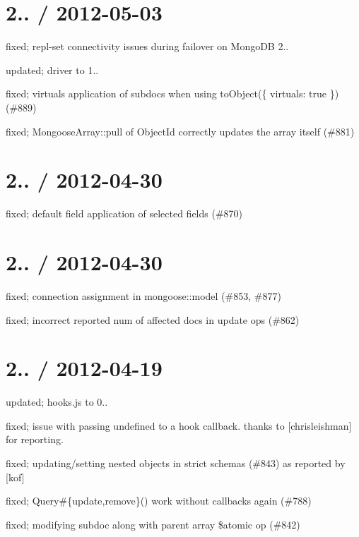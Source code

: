 \section*{2.. / 2012-\/05-\/03 }


\begin{DoxyItemize}
\item fixed; repl-\/set connectivity issues during failover on Mongo\+DB 2..
\item updated; driver to 1..
\item fixed; virtuals application of subdocs when using to\+Object(\{ virtuals\+: true \}) (\#889)
\item fixed; Mongoose\+Array\+::pull of Object\+Id correctly updates the array itself (\#881)
\end{DoxyItemize}

\section*{2.. / 2012-\/04-\/30 }


\begin{DoxyItemize}
\item fixed; default field application of selected fields (\#870)
\end{DoxyItemize}

\section*{2.. / 2012-\/04-\/30 }


\begin{DoxyItemize}
\item fixed; connection assignment in mongoose\+::model (\#853, \#877)
\item fixed; incorrect reported num of affected docs in update ops (\#862)
\end{DoxyItemize}

\section*{2.. / 2012-\/04-\/19 }


\begin{DoxyItemize}
\item updated; hooks.\+js to 0..
\item fixed; issue with passing undefined to a hook callback. thanks to \mbox{[}chrisleishman\mbox{]} for reporting.
\item fixed; updating/setting nested objects in strict schemas (\#843) as reported by \mbox{[}kof\mbox{]}
\item fixed; Query\#\{update,remove\}() work without callbacks again (\#788)
\item fixed; modifying subdoc along with parent array \$atomic op (\#842)
\end{DoxyItemize}

